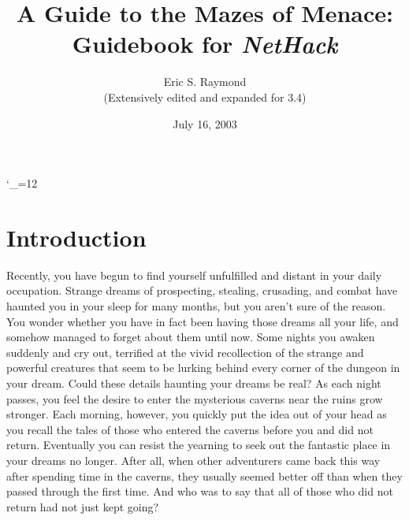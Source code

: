 
\textheight 220mm
\textwidth 160mm
\oddsidemargin 0mm
\evensidemargin 0mm
\topmargin 0mm

\newcommand{\nd}{\noindent}

\newcommand{\tb}[1]{\tt #1 \hfill}
\newcommand{\bb}[1]{\bf #1 \hfill}
\newcommand{\ib}[1]{\it #1 \hfill}

\newcommand{\blist}[1]
{\begin{list}{$\bullet$}
    {\leftmargin 30mm \topsep 2mm \partopsep 0mm \parsep 0mm \itemsep 1mm
     \labelwidth 28mm \labelsep 2mm
     #1}}

\newcommand{\elist}{\end{list}}

\catcode`\_=12


%
%

\title{\LARGE A Guide to the Mazes of Menace:\\
\Large Guidebook for {\it NetHack\/}}

\author{Eric S. Raymond\\
(Extensively edited and expanded for 3.4)}
\date{July 16, 2003}

\maketitle

\section{Introduction}


Recently, you have begun to find yourself unfulfilled and distant 
in your daily occupation.  Strange dreams of prospecting, stealing, 
crusading, and combat have haunted you in your sleep for many months, 
but you aren't sure of the reason.  You wonder whether you have in 
fact been having those dreams all your life, and somehow managed to 
forget about them until now.  Some nights you awaken suddenly
and cry out, terrified at the vivid recollection of the strange and 
powerful creatures that seem to be lurking behind every corner of the 
dungeon in your dream.  Could these details haunting your dreams be real?  
As each night passes, you feel the desire to enter the mysterious caverns 
near the ruins grow stronger.  Each morning, however, you quickly put 
the idea out of your head as you recall the tales of those who entered 
the caverns before you and did not return.  Eventually you can resist 
the yearning to seek out the fantastic place in your dreams no longer.  
After all, when other adventurers came back this way after spending time 
in the caverns, they usually seemed better off than when they passed 
through the first time.  And who was to say that all of those who did 
not return had not just kept going?

